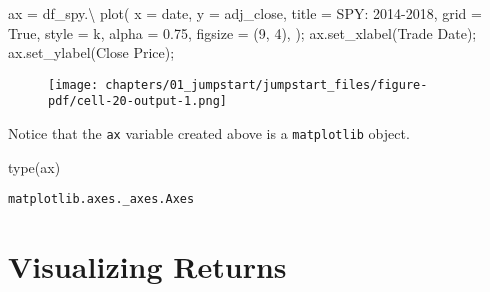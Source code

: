 \documentclass[
  letterpaper,
  DIV=11,
  numbers=noendperiod]{scrreprt}
\newenvironment{Shaded}{\begin{snugshade}}{\end{snugshade}}
\newcommand{\BuiltInTok}[1]{\textcolor[rgb]{0.00,0.23,0.31}{#1}}
\newcommand{\DecValTok}[1]{\textcolor[rgb]{0.68,0.00,0.00}{#1}}
\newcommand{\FloatTok}[1]{\textcolor[rgb]{0.68,0.00,0.00}{#1}}
\newcommand{\NormalTok}[1]{\textcolor[rgb]{0.00,0.23,0.31}{#1}}
\newcommand{\OperatorTok}[1]{\textcolor[rgb]{0.37,0.37,0.37}{#1}}
\newcommand{\StringTok}[1]{\textcolor[rgb]{0.13,0.47,0.30}{#1}}
\newcommand{\VariableTok}[1]{\textcolor[rgb]{0.07,0.07,0.07}{#1}}
\begin{document}
\begin{Shaded}
\begin{Highlighting}[]
\NormalTok{ax }\OperatorTok{=}\NormalTok{ df\_spy.}\OperatorTok{\textbackslash{}}
\NormalTok{        plot(}
\NormalTok{            x }\OperatorTok{=} \StringTok{\textquotesingle{}date\textquotesingle{}}\NormalTok{,}
\NormalTok{            y }\OperatorTok{=} \StringTok{\textquotesingle{}adj\_close\textquotesingle{}}\NormalTok{,}
\NormalTok{            title }\OperatorTok{=} \StringTok{\textquotesingle{}SPY: 2014{-}2018\textquotesingle{}}\NormalTok{,}
\NormalTok{            grid }\OperatorTok{=} \VariableTok{True}\NormalTok{,}
\NormalTok{            style }\OperatorTok{=} \StringTok{\textquotesingle{}k\textquotesingle{}}\NormalTok{,}
\NormalTok{            alpha }\OperatorTok{=} \FloatTok{0.75}\NormalTok{,}
\NormalTok{            figsize }\OperatorTok{=}\NormalTok{ (}\DecValTok{9}\NormalTok{, }\DecValTok{4}\NormalTok{),}
\NormalTok{        )}\OperatorTok{;}
\NormalTok{ax.set\_xlabel(}\StringTok{\textquotesingle{}Trade Date\textquotesingle{}}\NormalTok{)}\OperatorTok{;}
\NormalTok{ax.set\_ylabel(}\StringTok{\textquotesingle{}Close Price\textquotesingle{}}\NormalTok{)}\OperatorTok{;}
\end{Highlighting}
\end{Shaded}

\begin{figure}[H]

{\centering \texttt{[image: chapters/01\_jumpstart/jumpstart\_files/figure-pdf/cell-20-output-1.png]}

}

\end{figure}

Notice that the \texttt{ax} variable created above is a
\texttt{matplotlib} object.

\begin{Shaded}
\begin{Highlighting}[]
\BuiltInTok{type}\NormalTok{(ax)}
\end{Highlighting}
\end{Shaded}

\begin{verbatim}
matplotlib.axes._axes.Axes
\end{verbatim}

\hypertarget{visualizing-returns}{%
\section{Visualizing Returns}\label{visualizing-returns}}
\end{document}
